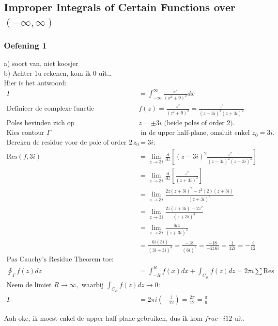 \documentclass[a4paper,twoside]{article}
\theoremstyle{definition}
\theoremstyle{plain}
\begin{document}
\subsection{Improper Integrals of Certain Functions over $(-\infty, \infty)$}
\subsubsection{Oefening 1}
a) soort van, niet koosjer\\
b) Achter 1u rekenen, kom ik 0 uit\dots \\
Hier is het antwoord:
\begin{align*}
I &= \int_{-\infty}^{\infty} \frac{x^2}{(x^2 + 9)^2} dx \\
\text{Definieer de complexe functie } & f(z) = \frac{z^2}{(z^2 + 9)^2} = \frac{z^2}{(z - 3i)^2(z + 3i)^2} \\
\text{Poles bevinden zich op } & z = \pm 3i \text{ (beide poles of order 2).} \\
\text{Kies contour } \Gamma & \text{ in de upper half-plane, omsluit enkel } z_0 = 3i. \\
\text{Bereken de residue voor de pole of order 2 op } z_0 &= 3i: \\
\text{Res}(f, 3i) &= \lim_{z \to 3i} \frac{d}{dz} \left[ (z - 3i)^2 \frac{z^2}{(z - 3i)^2(z + 3i)^2} \right] \\
&= \lim_{z \to 3i} \frac{d}{dz} \left[ \frac{z^2}{(z + 3i)^2} \right] \\
&= \lim_{z \to 3i} \frac{2z(z + 3i)^2 - z^2(2)(z + 3i)}{(z + 3i)^4} \\
&= \lim_{z \to 3i} \frac{2z(z + 3i) - 2z^2}{(z + 3i)^3} \\
&= \lim_{z \to 3i} \frac{6iz}{(z + 3i)^3} \\
&= \frac{6i(3i)}{(3i + 3i)^3} = \frac{-18}{(6i)^3} = \frac{-18}{-216i} = \frac{1}{12i} = -\frac{i}{12} \\
\text{Pas Cauchy's Residue Theorem toe:} \\
\oint_{\Gamma} f(z) dz &= \int_{-R}^{R} f(x) dx + \int_{C_R} f(z) dz = 2\pi i \sum \text{Res} \\
\text{Neem de limiet } R \to \infty, \text{ waarbij } \int_{C_R} f(z) dz \to 0: \\
I &= 2\pi i \left( -\frac{i}{12} \right) = \frac{2\pi}{12} = \frac{\pi}{6}
\end{align*}

Aah oke, ik moest enkel de upper half-plane gebruiken, dus ik kom \(frac{-i}{12}\) uit.\\
\end{document}
